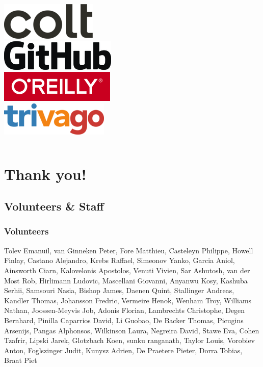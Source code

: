 \documentclass[aspectratio=169]{beamer}
\begin{document}
\begin{frame}
\begin{columns}[t]
	\centering
		\includegraphics[scale=0.2]{images/colt.png}\\
		\vspace{0.5cm}
		\includegraphics[scale=0.5]{images/github.png}\\
		\vspace{0.5cm}
		\includegraphics[scale=0.4]{images/oreilly.png}\\
		\vspace{0.5cm}
		\includegraphics[scale=0.4]{images/trivago.png}
	\end{columns}
\end{frame}

\section{Thank you!}

\subsection{Volunteers \& Staff}

\begin{frame}
	\frametitle{Volunteers}
Tolev Emanuil, van Ginneken Peter, Fore Matthieu, Casteleyn Philippe, Howell Finlay, Castano Alejandro, Krebs Raffael, Simeonov Yanko, Garcia Aniol, Ainsworth Ciarn, Kalovelonis Apostolos, Venuti Vivien, Sar Ashutosh, van der Most Rob, Hirlimann Ludovic, Mascellani Giovanni, Anyanwu Kosy, Kashuba Serhii, Samsouri Nasia, Bishop James, Daenen Quint, Stallinger Andreas, Kandler Thomas, Johansson Fredric, Vermeire Henok, Wenham Troy, Williams Nathan, Joossen-Meyvis Job, Adonis Florian, Lambrechts Christophe, Degen Bernhard, Pinilla Caparrios David, Li Guobao, De Backer Thomas, Picugins Arsenijs, Pangas Alphonsos, Wilkinson Laura, Negreira David, Stawe Eva, Cohen Tzafrir, Lipski Jarek, Glotzbach Koen, sunku ranganath, Taylor Louis, Vorobiev Anton, Foglszinger Judit, Kunysz Adrien, De Praetere Pieter, Dorra Tobias, Braat Piet
\end{frame}
\end{document}
